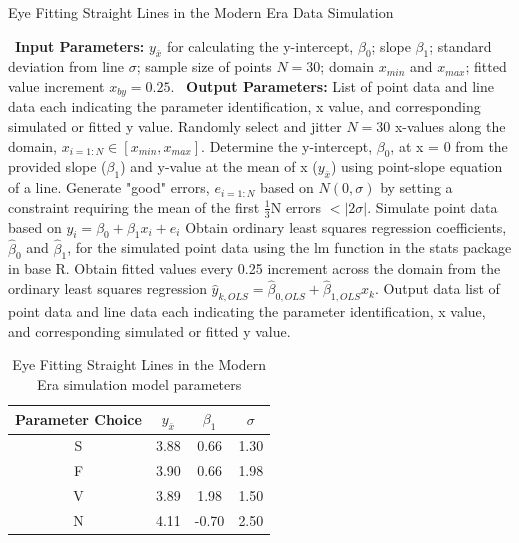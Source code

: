 \documentclass[12pt]{article}
\begin{document}
\begin{algorithm}
  \caption{Eye Fitting Straight Lines in the Modern Era Data Simulation}\label{alg:eyefitting-algorithm}
  \begin{algorithmic}[1]
    \Statex \textbullet~\textbf{Input Parameters:} $y_{\bar{x}}$ for calculating the y-intercept, $\beta_0$; slope $\beta_1$; standard deviation from line $\sigma$; sample size of points $N = 30$; domain $x_{min}$ and $x_{max}$; fitted value increment $x_{by} = 0.25$.
    \Statex \textbullet~\textbf{Output Parameters:} List of point data and line data each indicating the parameter identification, x value, and corresponding simulated or fitted y value.
    \State Randomly select and jitter $N = 30$ x-values along the domain, $x_{i=1:N}\in [x_{min}, x_{max}]$.
    \State Determine the y-intercept, $\beta_0$, at x = 0 from the provided slope ($\beta_1$) and y-value at the mean of x ($y_{\bar{x}}$) using point-slope equation of a line.
    \State Generate "good" errors, $e_{i = 1:N}$ based on $N(0,\sigma)$ by setting a constraint requiring the mean of the first $\frac{1}{3}\text{N}$ errors $< |2\sigma|.$
    \State Simulate point data based on $y_i = \beta_0 + \beta_1 x_i + e_i$
    \State Obtain ordinary least squares regression coefficients, $\hat\beta_0$ and $\hat\beta_1$, for the simulated point data using the lm function in the stats package in base R.
    \State Obtain fitted values every 0.25 increment across the domain from the ordinary least squares regression $\hat y_{k,OLS} = \hat\beta_{0,OLS} + \hat\beta_{1,OLS} x_k$.
    \State Output data list of point data and line data each indicating the parameter identification, x value, and corresponding simulated or fitted y value.
  \end{algorithmic}
\end{algorithm}

\begin{table}

\caption{\label{tab:eyefitting-parameters}Eye Fitting Straight Lines in the Modern Era simulation model parameters}
\centering
\begin{tabular}[t]{cccc}
\toprule
Parameter Choice & $y_{\bar{x}}$ & $\beta_1$ & $\sigma$\\
\midrule
S & 3.88 & 0.66 & 1.30\\
F & 3.90 & 0.66 & 1.98\\
V & 3.89 & 1.98 & 1.50\\
N & 4.11 & -0.70 & 2.50\\
\bottomrule
\end{tabular}
\end{table}
\end{document}
